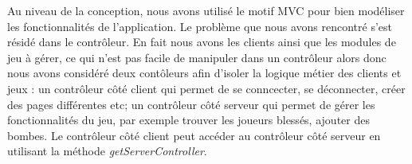 Au niveau de la conception, nous avons utilisé le motif MVC pour bien
modéliser les fonctionnalités de l'application. Le problème que nous
avons rencontré s'est résidé dans le contrôleur. En fait nous avons
les clients ainsi que les modules de jeu à gérer, ce qui n'est pas
facile de manipuler dans un contrôleur alors donc nous avons 
considéré deux contôleurs afin d'isoler la logique métier des 
clients et jeux : un contrôleur côté client qui permet de se conncecter, se déconnecter, créer des pages différentes etc; un 
contrôleur côté serveur qui permet de gérer les fonctionnalités du jeu, par exemple trouver les joueurs blessés, ajouter des bombes. Le 
contrôleur côté client peut accéder au contrôleur côté serveur en utilisant la méthode \textit{getServerController}.
